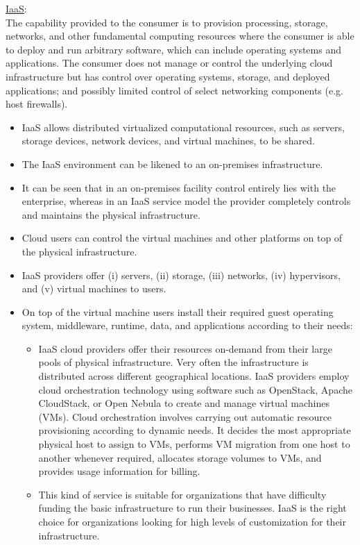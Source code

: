 \documentclass[a4paper, 12pt]{article}
\begin{document}
\underline{IaaS}:\\
The capability provided to the consumer is to provision processing, storage, networks, and other fundamental  computing resources where the consumer is able to deploy and run arbitrary software, which can include operating systems and applications. The consumer does not manage or control the underlying cloud infrastructure but has control over operating systems, storage, and deployed applications; and possibly limited control of select networking components (e.g. host firewalls).
\begin{itemize}
\item
IaaS allows distributed virtualized computational resources, such as servers, storage devices, network devices, and virtual machines, to be shared.
\item
The IaaS environment can be likened to an on-premises infrastructure.
\item
It can be seen that in an on-premises facility control entirely lies with the enterprise, whereas in an IaaS service model the provider completely controls and maintains the physical infrastructure.
\item
Cloud users can control the virtual machines and other platforms on top of the physical infrastructure.
\item
IaaS providers offer (i) servers, (ii) storage, (iii) networks, (iv) hypervisors, and (v) virtual machines to users.
\item
On top of the virtual machine users install their required guest operating system, middleware, runtime, data, and applications according to their needs:
\begin{itemize}
\item
IaaS cloud providers offer their resources on-demand from their large pools of physical infrastructure. Very often the infrastructure is distributed across different geographical locations. IaaS providers employ cloud orchestration technology using software such as OpenStack, Apache CloudStack, or Open Nebula to create and manage virtual machines (VMs). Cloud orchestration involves carrying out automatic resource provisioning according to dynamic needs. It decides the most appropriate physical host to assign to VMs, performs VM migration from one host to another whenever required, allocates storage volumes to VMs, and provides usage information for billing.
\item
This kind of service is suitable for organizations that have difficulty funding the basic infrastructure to run their businesses. IaaS is the right choice for organizations looking for high levels of customization for their infrastructure.

\end{itemize}
\end{itemize}
\end{document}

